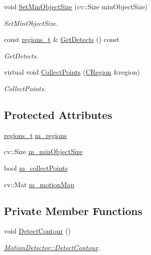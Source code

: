 \begin{DoxyCompactItemize}
void \mbox{\hyperlink{class_base_detector_ab459f4e77cf1110cc1ee84027f0f2a03}{Set\+Min\+Object\+Size}} (cv\+::\+Size min\+Object\+Size)
\begin{DoxyCompactList}\small\item\em Set\+Min\+Object\+Size. \end{DoxyCompactList}\item 
const \mbox{\hyperlink{defines_8h_a01db0de56a20f4342820a093c5154536}{regions\+\_\+t}} \& \mbox{\hyperlink{class_base_detector_a52ac4b2feed15a47de84a69eb45c233f}{Get\+Detects}} () const
\begin{DoxyCompactList}\small\item\em Get\+Detects. \end{DoxyCompactList}\item 
virtual void \mbox{\hyperlink{class_base_detector_a20380b0980c6f262b0829f37fb89d2a7}{Collect\+Points}} (\mbox{\hyperlink{class_c_region}{C\+Region}} \&region)
\begin{DoxyCompactList}\small\item\em Collect\+Points. \end{DoxyCompactList}\end{DoxyCompactItemize}
\subsection*{Protected Attributes}
\begin{DoxyCompactItemize}
\item 
\mbox{\hyperlink{defines_8h_a01db0de56a20f4342820a093c5154536}{regions\+\_\+t}} \mbox{\hyperlink{class_base_detector_a409c20093acba261db8354ca72058fce}{m\+\_\+regions}}
\item 
cv\+::\+Size \mbox{\hyperlink{class_base_detector_a651b938c89c94daac4763728637d90c9}{m\+\_\+min\+Object\+Size}}
\item 
bool \mbox{\hyperlink{class_base_detector_a403cbf784fcb960bdb7d080c86c4a2ea}{m\+\_\+collect\+Points}}
\item 
cv\+::\+Mat \mbox{\hyperlink{class_base_detector_a45a2d54a0b69e271aa5c44ee301682b7}{m\+\_\+motion\+Map}}
\end{DoxyCompactItemize}
\subsection*{Private Member Functions}
\begin{DoxyCompactItemize}
\item 
void \mbox{\hyperlink{class_motion_detector_ab45a525c0ef2f5af9bc10c363c1b22e5}{Detect\+Contour}} ()
\begin{DoxyCompactList}\small\item\em \mbox{\hyperlink{class_motion_detector_ab45a525c0ef2f5af9bc10c363c1b22e5}{Motion\+Detector\+::\+Detect\+Contour}}. \end{DoxyCompactList}\end{DoxyCompactItemize}
